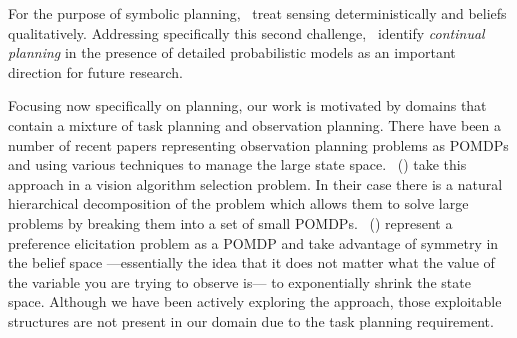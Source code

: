 
\cite{wyattetal2010tamd}

For the purpose of symbolic
planning,~\cite{wyattetal2010tamd,talamadupula:2010,Kraft2008} treat
sensing deterministically and beliefs qualitatively.
 Addressing specifically this second
challenge,~\citeauthor{talamadupula:2010} identify
\emph{continual planning} in the presence of detailed probabilistic
 models as an important direction for future research.


Focusing now specifically on planning, our work is motivated by
domains that contain a mixture of task planning and observation
planning. There have been a number of recent papers representing
observation planning problems as POMDPs and using various techniques
to manage the large state
space. \citeauthor{hippo-jnl}~(\citeyear{hippo-jnl}) take this
approach in a vision algorithm selection problem. In their case there
is a natural hierarchical decomposition of the problem which allows
them to solve large problems by breaking them into a set of small
POMDPs. \citeauthor{doshi08:pref_elic}~(\citeyear{doshi08:pref_elic})
represent a preference elicitation problem as a POMDP and take
advantage of symmetry in the belief space ---essentially the idea that
it does not matter what the value of the variable you are trying to
observe is--- to exponentially shrink the state space. Although we
have been actively exploring the \citeauthor{doshi08:pref_elic}
approach, those exploitable structures are not present in our domain
due to the task planning requirement.

\cite{shani:etal:08}


